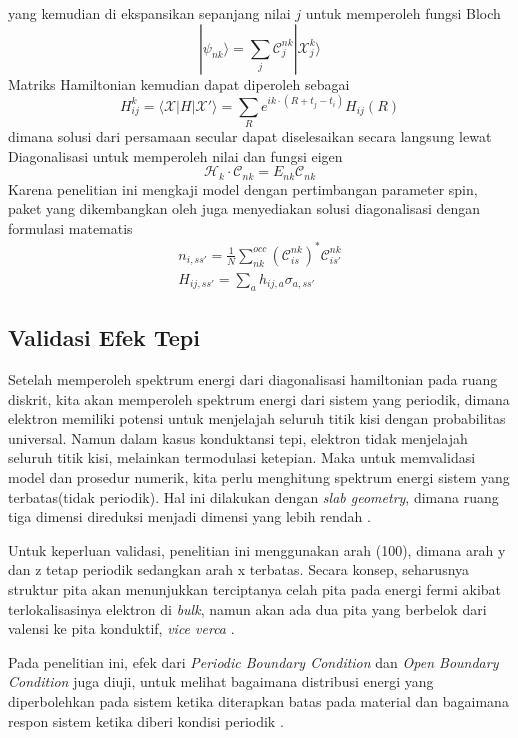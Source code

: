 yang kemudian di ekspansikan sepanjang nilai $j$ untuk memperoleh fungsi Bloch
\[
|\psi_{nk} \rangle = \sum_j \mathcal{C}_j^{nk} |\mathcal{X}_j^k \rangle
\]
Matriks Hamiltonian kemudian dapat diperoleh sebagai
\[
H_{ij}^k = \langle \mathcal{X}|H |\mathcal{X'} \rangle = \sum_R e^{i k \cdot (R + t_j -t_i)}H_{ij}(R)
\]
dimana solusi dari persamaan secular dapat diselesaikan secara langsung lewat Diagonalisasi untuk memperoleh nilai dan fungsi eigen 
\[ 
\mathcal{H}_k \cdot \mathcal{C}_{nk} = E_{nk}\mathcal{C}_{nk}
\]
Karena penelitian ini mengkaji model dengan pertimbangan parameter spin, paket yang dikembangkan oleh \parencite{Cole_Python_Tight_Binding_2025} juga menyediakan solusi diagonalisasi dengan formulasi matematis
\[ 
\begin{align}
n_{i, ss'} = \frac{1}{N} \sum_{nk}^{occ}(\mathcal{C}^{nk}_{is})^* \mathcal{C}^{nk}_{is'} \\
H_{ij, ss'} = \sum_a h_{ij,a} \sigma_{a, ss'}
\end{align}
\]
\subsection{Validasi Efek Tepi}

Setelah memperoleh spektrum energi dari diagonalisasi hamiltonian pada ruang diskrit, kita akan memperoleh spektrum energi dari sistem yang periodik, dimana elektron memiliki potensi untuk menjelajah seluruh titik kisi dengan probabilitas universal. Namun dalam kasus konduktansi tepi, elektron tidak menjelajah seluruh titik kisi, melainkan termodulasi ketepian. Maka untuk memvalidasi model dan prosedur numerik, kita perlu menghitung spektrum energi sistem yang terbatas(tidak periodik). Hal ini dilakukan dengan \textit{slab geometry}, dimana ruang tiga dimensi direduksi menjadi dimensi yang lebih rendah \parencite{Cole_Python_Tight_Binding_2025}.
\par
Untuk keperluan validasi, penelitian ini menggunakan arah (100), dimana arah y dan z tetap periodik sedangkan arah x terbatas. Secara konsep, seharusnya struktur pita akan menunjukkan terciptanya celah pita pada energi fermi akibat terlokalisasinya elektron di \textit{bulk}, namun akan ada dua pita yang berbelok dari valensi ke pita konduktif, \textit{vice verca} \parencite{PhysRevB.91.085106} .

\par
Pada penelitian ini, efek dari \textit{Periodic Boundary Condition} dan \textit{Open Boundary Condition} juga diuji, untuk melihat bagaimana distribusi energi yang diperbolehkan pada sistem ketika diterapkan batas pada material dan bagaimana respon sistem ketika diberi kondisi periodik \parencite{Cole_Python_Tight_Binding_2025} .


